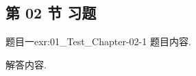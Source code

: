\subsection{第 02 节 习题}


\begin{exercise}{题目一}{exr:01_Test_Chapter-02-1}
    题目内容.
\end{exercise}

\begin{solution}
    解答内容.
\end{solution}
